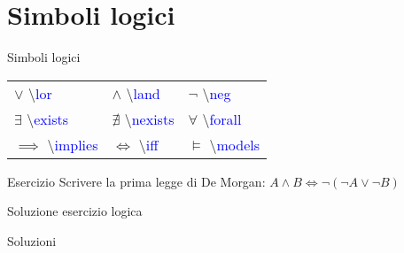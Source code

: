 \section{Simboli logici}
  \begin{frame}{Simboli logici}

	\begin{table}[h!]
	\begin{tabular}{p{2.6cm} p{2.6cm} p{2.6cm}}
	\hline
	$\lor$ \textbackslash \textcolor{blue}{lor} & $\land$ \textbackslash \textcolor{blue}{land} & $\neg$ \textbackslash \textcolor{blue}{neg} \\[0.4cm]
	$\exists$ \textbackslash \textcolor{blue}{exists} & $\nexists$ \textbackslash \textcolor{blue}{nexists} & $\forall$ \textbackslash \textcolor{blue}{forall} \\[0.4cm]
	$\implies$ \textbackslash \textcolor{blue}{implies} & $\iff$ \textbackslash \textcolor{blue}{iff} & $\models$ \textbackslash \textcolor{blue}{models} \\
	\hline
	\end{tabular}
	\end{table}

	\begin{block}{Esercizio}
	Scrivere la prima legge di De Morgan: $A \land B \iff \neg (\neg A \lor \neg B)$
	\end{block}

\end{frame}

\begin{frame}{Soluzione esercizio logica}

    \begin{exampleblock}{Soluzioni}
      
    \end{exampleblock}

\end{frame}
